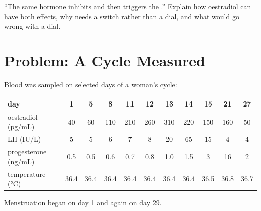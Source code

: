 \begin{exercise}[$\star\star\star$]\label{exo:b2:reproductive-hormones:12}
``The same hormone inhibits and then triggers the .''
Explain how oestradiol can have both effects, why  needs a
switch rather than a dial, and what would go wrong with a dial.
\end{exercise}

\section{Problem: A Cycle Measured}

\begin{problem}
\label{pb:b2:reproductive-hormones:1}
Blood was sampled on selected days of a woman's cycle:

\begin{center}
\small
\begin{tabular}{lcccccccccc}
\hline
day & 1 & 5 & 8 & 11 & 12 & 13 & 14 & 15 & 21 & 27 \\
\hline
oestradiol (\unit{pg/mL}) & 40 & 60 & 110 & 210 & 260 & 310 & 220 & 150 & 160 & 50 \\
LH (\unit{IU/L}) & 5 & 5 & 6 & 7 & 8 & 20 & 65 & 15 & 4 & 4 \\
progesterone (\unit{ng/mL}) & 0.5 & 0.5 & 0.6 & 0.7 & 0.8 & 1.0 & 1.5 & 3 & 16 & 2 \\
temperature (\unit{\celsius}) & 36.4 & 36.4 & 36.4 & 36.4 & 36.4 & 36.4 & 36.4 & 36.5 & 36.8 & 36.7 \\
\hline
\end{tabular}
\end{center}

Menstruation began on day 1 and again on day 29.


\end{problem}
